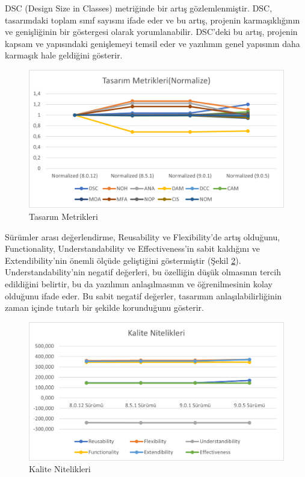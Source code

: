 \documentclass[conference]{IEEEtran}
\begin{document}
DSC (Design Size in Classes) metriğinde bir artış gözlemlenmiştir. DSC, tasarımdaki toplam sınıf sayısını ifade eder ve bu artış, projenin karmaşıklığının ve genişliğinin bir göstergesi olarak yorumlanabilir. DSC'deki bu artış, projenin kapsam ve yapısındaki genişlemeyi temsil eder ve yazılımın genel yapısının daha karmaşık hale geldiğini gösterir.

\begin{figure}[h]
	\centering
	\includegraphics[scale=0.6]{metrik.png}
	\caption{Tasarım Metrikleri}
	\label{sekil2}
\end{figure}

Sürümler arası değerlendirme, Reusability ve Flexibility'de artış olduğunu, Functionality, Understandability ve Effectiveness'in sabit kaldığını ve Extendibility'nin önemli ölçüde geliştiğini göstermiştir (Şekil \ref{sekil3}). Understandability'nin negatif değerleri, bu özelliğin düşük olmasının tercih edildiğini belirtir, bu da yazılımın anlaşılmasının ve öğrenilmesinin kolay olduğunu ifade eder. Bu sabit negatif değerler, tasarımın anlaşılabilirliğinin zaman içinde tutarlı bir şekilde korunduğunu gösterir.

\begin{figure}[h]
	\centering
	\includegraphics[scale=0.6]{nitelik.png}
	\caption{Kalite Nitelikleri}
	\label{sekil3}
\end{figure}
\end{document}
